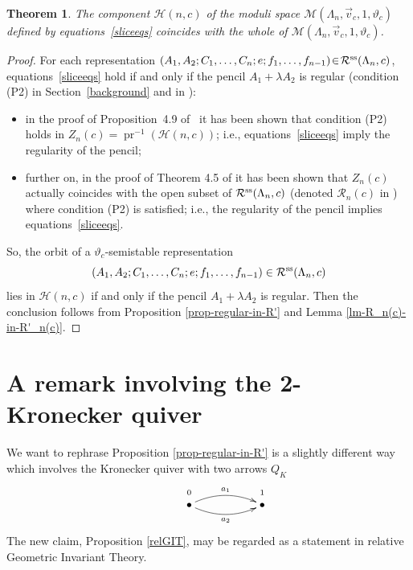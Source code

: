 \documentclass[pdftex]{sigma}
\numberwithin{equation}{section}
\newtheorem{Theorem}{Theorem}[section]
\begin{document}
\begin{Theorem}\label{mainthm} The component $\mathcal{H} (n,c) $ of the moduli
space $\mathcal{M}(\Lambda_n,\vec{v}_c, 1, \vartheta_c)$ defined by equations~\eqref{sliceeqs}
coincides with the whole of $\mathcal{M}(\Lambda_n,\vec{v}_c, 1, \vartheta_c)$.
\end{Theorem}
\begin{proof}For each representation $(A_1,A_2;C_1, \dots,C_n;e;f_1,\dots,f_{n-1}) \!\in\! \mathcal{R}^{\rm ss}(\Lambda_n,c)$, equations~\eqref{sliceeqs} hold if and only if the pencil $A_1 + \lambda A_2$ is regular (condition (P2) in Section~\ref{background} and in \cite{bblr}):
\begin{itemize}\itemsep=0pt
 \item in the proof of Proposition~4.9 of~\cite{bblr} it has been shown that condition (P2) holds in $Z_n(c)=\operatorname{pr}^{-1}(\mathcal{H} (n,c))$; i.e., equations~\eqref{sliceeqs} imply the regularity of the pencil;
 \item further on, in the proof of Theorem 4.5 of \cite{bblr} it has been shown that $Z_n(c)$ actually coincides with the open subset of $\mathcal{R}^{\rm ss}(\Lambda_n,c)$ (denoted $\mathcal{R}_n(c)$ in \cite{bblr}) where condition (P2) is satisfied; i.e., the regularity of the pencil implies equations~\eqref{sliceeqs}.
 \end{itemize}
So, the orbit of a $\vartheta_c$-semistable representation \[(A_1,A_2;C_1, \dots,C_n;e;f_1,\dots,f_{n-1}) \in \mathcal{R}^{\rm ss}(\Lambda_n,c)\] lies in $\mathcal{H}(n,c)$ if and only if the pencil $A_1 + \lambda A_2$ is regular. Then the conclusion follows from Proposition \ref{prop-regular-in-R'} and Lemma \ref{lm-R_n(c)-in-R'_n(c)}.
\end{proof}


\section{A remark involving the 2-Kronecker quiver}
We want to rephrase Proposition \ref{prop-regular-in-R'} is a slightly different way which involves the Kronecker quiver
 with two arrows $Q_{K}$
$$
 \xymatrix@R-2.3em{
&\mbox{\scriptsize$0$}&&\mbox{\scriptsize$1$}\\
&\bullet\ar@/^2ex/[rr]^{a_{1}}\ar@/_2ex/[rr]_{a_{2}}&&\bullet
}
$$
The new claim, Proposition \ref{relGIT}, may be regarded as a statement in relative Geometric Invariant Theory.
\end{document}
